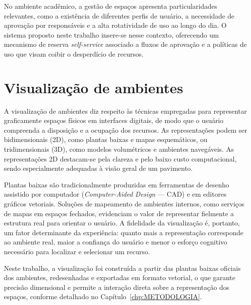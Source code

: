 No ambiente acadêmico, a gestão de espaços apresenta particularidades relevantes, como a existência de diferentes perfis de usuário, a necessidade de aprovação por responsáveis e a alta rotatividade de uso ao longo do dia. O sistema proposto neste trabalho insere-se nesse contexto, oferecendo um mecanismo de reserva \textit{self-service} associado a fluxos de aprovação e a políticas de uso que visam coibir o desperdício de recursos.

\section{Visualização de ambientes}\label{sec:visualizacaoDeAmbientes}


A visualização de ambientes diz respeito às técnicas empregadas para representar graficamente espaços físicos em interfaces digitais, de modo que o usuário compreenda a disposição e a ocupação dos recursos. As representações podem ser bidimensionais (2D), como plantas baixas e mapas esquemáticos, ou tridimensionais (3D), como modelos volumétricos e ambientes navegáveis. As representações 2D destacam-se pela clareza e pelo baixo custo computacional, sendo especialmente adequadas à visão geral de um pavimento. %

Plantas baixas são tradicionalmente produzidas em ferramentas de desenho assistido por computador (\textit{Computer-Aided Design} — CAD) e em editores gráficos vetoriais. Soluções de mapeamento de ambientes internos, como serviços de mapas em espaços fechados, evidenciam o valor de representar fielmente a estrutura real para orientar o usuário. A fidelidade da visualização é, portanto, um fator determinante da experiência: quanto mais a representação corresponde ao ambiente real, maior a confiança do usuário e menor o esforço cognitivo necessário para localizar e selecionar um recurso. %

Neste trabalho, a visualização foi construída a partir das plantas baixas oficiais dos ambientes, redesenhadas e exportadas em formato vetorial, o que garante precisão dimensional e permite a interação direta sobre a representação dos espaços, conforme detalhado no Capítulo~\ref{chp:METODOLOGIA}.

